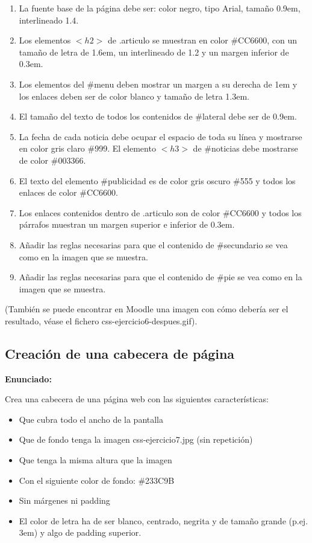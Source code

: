 \begin{enumerate}
  \item La fuente base de la página debe ser: color negro, tipo Arial, tamaño 0.9em, interlineado 1.4.
  \item Los elementos $<h2>$ de .articulo se muestran en color \#CC6600, con un tamaño de letra de 1.6em, un interlineado de 1.2 y un margen inferior de 0.3em.
  \item Los elementos del \#menu deben mostrar un margen a su derecha de 1em y los enlaces deben ser de color blanco y tamaño de letra 1.3em.
  \item El tamaño del texto de todos los contenidos de \#lateral debe ser de 0.9em.   
\item La fecha de cada noticia debe ocupar el espacio de toda su línea y mostrarse en color gris claro \#999. El elemento $<h3>$ de \#noticias debe mostrarse de color \#003366.
  \item El texto del elemento \#publicidad es de color gris oscuro \#555 y todos los enlaces de color \#CC6600.
  \item Los enlaces contenidos dentro de .articulo son de color \#CC6600 y todos los párrafos muestran un margen superior e inferior de 0.3em.
  \item Añadir las reglas necesarias para que el contenido de \#secundario se vea como en la imagen que se muestra.
  \item Añadir las reglas necesarias para que el contenido de \#pie se vea como en la imagen que se muestra.
\end{enumerate}

(También se puede encontrar en Moodle una imagen con cómo debería ser el resultado, 
véase el fichero css-ejercicio6-despues.gif).

\subsection{Creación de una cabecera de página}
\label{subsec:cabecera}

\textbf{Enunciado:}

Crea una cabecera de una página web con las siguientes características:

\begin{itemize}
  \item Que cubra todo el ancho de la pantalla
  \item Que de fondo tenga la imagen css-ejercicio7.jpg (sin repetición)
  \item Que tenga la misma altura que la imagen
  \item Con el siguiente color de fondo: \#233C9B
  \item Sin márgenes ni padding
  \item El color de letra ha de ser blanco, centrado, negrita y de tamaño grande (p.ej. 3em) y algo de padding superior.
\end{itemize}


